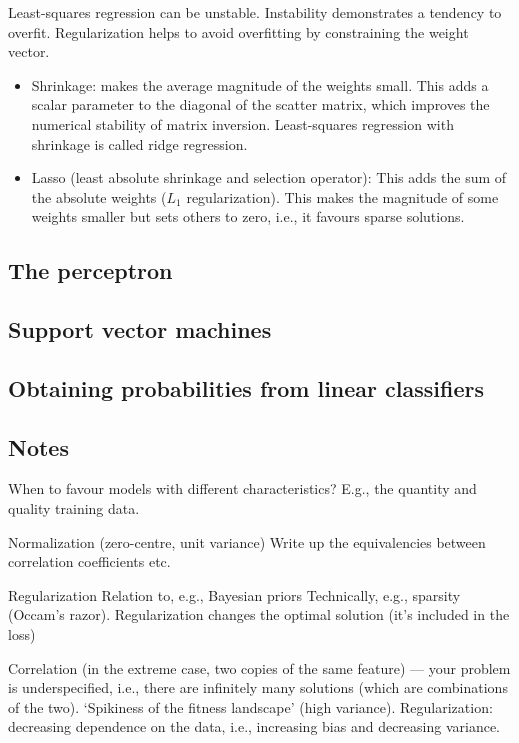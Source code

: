Least-squares regression can be unstable.
Instability demonstrates a tendency to overfit.
Regularization helps to avoid overfitting by constraining the weight vector.

\begin{itemize}
  \item Shrinkage: makes the average magnitude of the weights small.
        This adds a scalar parameter to the diagonal of the scatter matrix, which
        improves the numerical stability of matrix inversion.
        Least-squares regression with shrinkage is called ridge regression.
  \item Lasso (least absolute shrinkage and selection operator): This adds the
        sum of the absolute weights ($L_1$ regularization).
        This makes the magnitude of some weights smaller but sets others to zero, i.e.,
        it favours sparse solutions.
\end{itemize}

\subsection{The perceptron}

\subsection{Support vector machines}

\subsection{Obtaining probabilities from linear classifiers}

\subsection{Notes}

When to favour models with different characteristics?
E.g., the quantity and quality training data.

Normalization (zero-centre, unit variance) Write up the equivalencies between
correlation coefficients etc.

Regularization Relation to,
e.g., Bayesian priors Technically, e.g., sparsity (Occam's razor).
Regularization changes the optimal solution (it's included in the loss)

Correlation (in the extreme case, two copies of the same
feature) — your problem is underspecified, i.e., there are infinitely many
solutions (which are combinations of the two).
`Spikiness of the fitness landscape' (high variance).
Regularization: decreasing dependence on the data, i.e., increasing bias and
decreasing variance.

